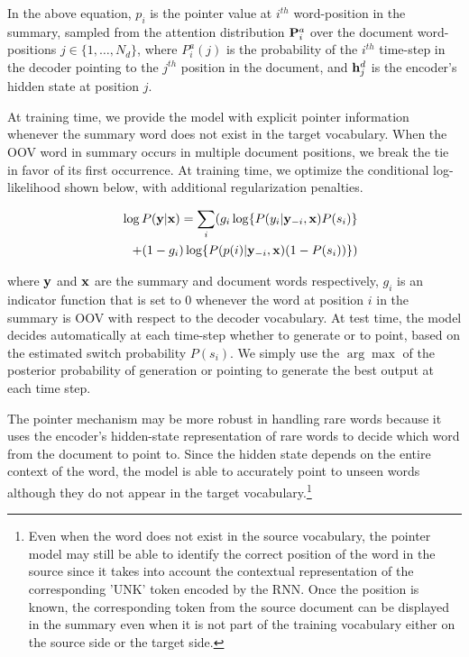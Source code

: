 In the above equation, $p_i$ is the pointer value at $i^{th}$ word-position in the summary, sampled from the attention distribution ${\bf P}^a_i$ over the document word-positions $j \in \{1,\ldots,N_d\}$, where $P^a_i(j)$ is the probability of the $i^{th}$ time-step in the decoder pointing to the $j^{th}$ position in the document, and ${\bf h}^d_j$ is the encoder's hidden state at position $j$. 

At training time, we provide the model with explicit pointer information whenever the summary word does not exist in the target vocabulary. When the OOV word in summary occurs in multiple document positions, we break the tie in favor of its first occurrence. At training time, we optimize the conditional log-likelihood shown below, with additional regularization penalties.

\begin{eqnarray}
&& \log P({\bf y}|{\bf x}) = \sum_i (g_i\log \{P(y_i | {\bf y}_{-i}, {\bf x})P(s_i)\} \nonumber\\
 &&+  (1-g_i)\log\{P(p(i)|{\bf y}_{-i},{\bf x})(1-P(s_i))\})\nonumber
\end{eqnarray}

where ${\bf y}$ and ${\bf x}$ are the summary and document words respectively, $g_i$ is an indicator function that is set to 0 whenever the word at position $i$ in the summary is OOV with respect to the decoder vocabulary. At test time, the model decides automatically at each time-step whether to generate or to point, based on the estimated switch probability $P(s_i)$.  We simply use the $\arg\max $ of the posterior probability of generation or pointing to generate the best output at each time step.

The pointer mechanism may be more robust in handling rare words because it uses the encoder's hidden-state representation of rare words to decide which word from the document to point to. Since the hidden state depends on the entire context of the word, the model is able to accurately point to unseen words although they do not appear in the target vocabulary.\footnote{Even when the word does not exist in the source vocabulary, the pointer model may still be able to identify the correct position of the word in the source since it takes into account the contextual representation of the corresponding 'UNK' token encoded by the RNN. Once the position is known, the corresponding token from the source document can be displayed in the summary even when it is not part of the training vocabulary either on the source side or the target side.}  

